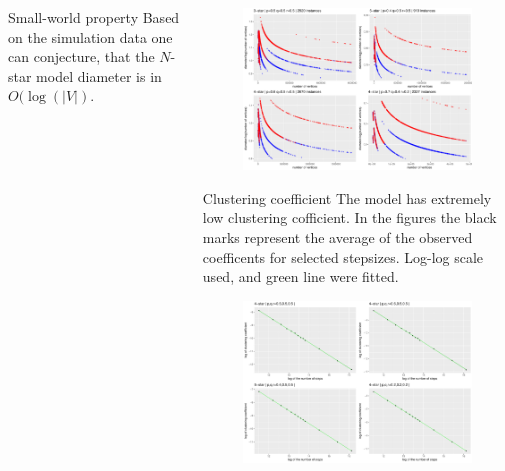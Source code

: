 \documentclass[final]{beamer}
\newlength{\onecolwid}
\newlength{\twocolwid}
\begin{document}
\begin{frame}[t]
\begin{columns}[t]
\begin{column}{\twocolwid}
\begin{columns}[t,totalwidth=\twocolwid]
\begin{column}{\onecolwid}
\begin{block}{Small-world property}\small
Based on the simulation data one can conjecture, that the $N$-star model 
diameter is in $O(\log(|V|)$.
\end{block}


 
\end{column} %


\begin{column}{\onecolwid}\vspace{-.6in} %
\begin{block}{}\small
\begin{figure}
  \includegraphics[width=0.8\linewidth]{./fig/csilldiam4.pdf}
\end{figure}
\end{block}


\begin{block}{Clustering coefficient}\small
The model has extremely low clustering cofficient. In the figures the black 
marks represent the average of the observed coefficents for selected stepsizes. 
Log-log scale used, and green line were fitted. 
\vskip 2cm
\begin{figure}
  \includegraphics[width=0.8\linewidth]{./fig/csillclustlog4.pdf}
\end{figure}
\end{block}





\end{column}
\end{columns}
\end{column}
\end{columns}
\end{frame}
\end{document}
